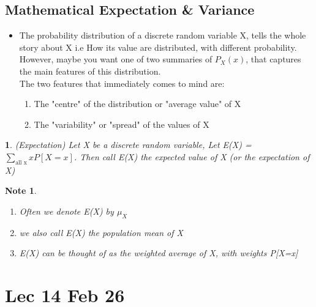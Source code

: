 \documentclass[11pt]{article}
\newtheorem*{note}{Note}
\newtheorem{definition}{\framebox{DEF}}[section]
\newcommand\tab[1][1cm]{\hspace*{#1}}
\begin{document}
        \subsection{Mathematical Expectation \& Variance}
            \begin{itemize}
                \item[\textbf{\framebox{Idea:}}] The probability distribution of a discrete random variable X, tells the whole story about X 
                                                    i.e How its value are distributed, with different probability. \\
                                                    However, maybe you want one of two summaries of $P_X(x)$, that captures the main features of this distribution.\\
                                                    The two features that immediately comes to mind are: 
                                                    \begin{enumerate}
                                                        \item The "centre" of the distribution or "average value" of X
                                                        \item The "variability" or "spread" of the values of X
                                                    \end{enumerate}
            \end{itemize}
            \begin{definition}(Expectation)
                Let X be a discrete random variable, Let E(X) = $\sum\limits_{\text{all x}} x P[X=x]$. 
                Then call E(X) the expected value of X (or the expectation of X)  
            \end{definition}
            \begin{note}\tab 
                \begin{enumerate}
                    \item Often we denote E(X) by $\mu_X$
                    \item we also call E(X) the population mean of X
                    \item E(X) can be thought of as the weighted average of X, with weights P[X=x]
                \end{enumerate}
            \end{note}
    \section{Lec 14 Feb 26}
\end{document}
